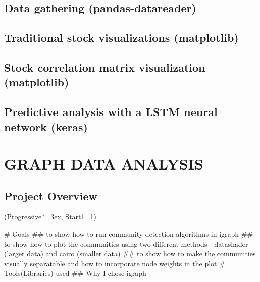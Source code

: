 \documentclass[12pt, a4paper]{article}
\let\OldEasylist\easylist
\let\OldEndEasylist\endeasylist
\renewenvironment{easylist}{%
    \OldEasylist%
    \ListProperties(Progressive*=3ex, Start1=1)%
}{%
    \OldEndEasylist%
}%
\begin{document}
\newpage
\subsection{Data gathering (pandas-datareader)}

\newpage
\subsection{Traditional stock visualizations (matplotlib)}

\newpage
\subsection{Stock correlation matrix visualization (matplotlib)}

\newpage
\subsection{Predictive analysis with a LSTM neural network (keras)}



\newpage
\section{GRAPH DATA ANALYSIS}
\subsection{Project Overview}
\begin{easylist}
# Goals
## to show how to run community detection algorithms in igraph
## to show how to plot the communities using two different methods - datashader  (larger data) and cairo (smaller data)
## to show how to make the communities visually separatable and how to incorporate node weights in the plot
# Tools(Libraries) used
## Why I chose igraph
\end{easylist}
\end{document}
